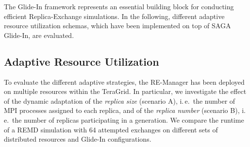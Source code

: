 \documentclass{rspublic}
\begin{document}

The Glide-In framework represents an essential building block for conducting efficient
Replica-Exchange simulations. In the following, different adaptive resource 
utilization schemas, which have been implemented on top of SAGA Glide-In,
are evaluated.

\subsection{Adaptive Resource Utilization}

To evaluate the different adaptive strategies, the RE-Manager
has been deployed on multiple resources within the
TeraGrid. In particular, we investigate the effect of 
the dynamic adaptation of the \emph{replica size} (scenario A), i.\,e.\ 
the number of MPI processes assigned to each replica,  
and of the \emph{replica number} (scenario B), i.\,e.\
the number of replicas participating in a generation.  
We compare the runtime of a REMD simulation with 64 attempted 
exchanges on different sets of distributed resources and Glide-In 
configurations.  
                    
\end{document}
